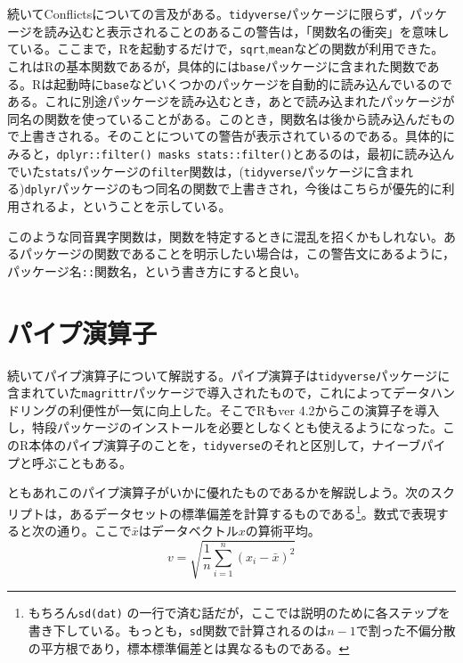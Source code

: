 \documentclass[
  a4paper,
]{ltjsbook}
\begin{document}
続いてConflictsについての言及がある。\texttt{tidyverse}パッケージに限らず，パッケージを読み込むと表示されることのあるこの警告は，「関数名の衝突」を意味している。ここまで，Rを起動するだけで，\texttt{sqrt},\texttt{mean}などの関数が利用できた。これはRの基本関数であるが，具体的には\texttt{base}パッケージに含まれた関数である。Rは起動時に\texttt{base}などいくつかのパッケージを自動的に読み込んでいるのである。これに別途パッケージを読み込むとき，あとで読み込まれたパッケージが同名の関数を使っていることがある。このとき，関数名は後から読み込んだもので上書きされる。そのことについての警告が表示されているのである。具体的にみると，\texttt{dplyr::filter()\ masks\ stats::filter()}とあるのは，最初に読み込んでいた\texttt{stats}パッケージの\texttt{filter}関数は，(\texttt{tidyverse}パッケージに含まれる)\texttt{dplyr}パッケージのもつ同名の関数で上書きされ，今後はこちらが優先的に利用されるよ，ということを示している。

このような同音異字関数は，関数を特定するときに混乱を招くかもしれない。あるパッケージの関数であることを明示したい場合は，この警告文にあるように，パッケージ名\texttt{::}関数名，という書き方にすると良い。

\section{パイプ演算子}\label{ux30d1ux30a4ux30d7ux6f14ux7b97ux5b50}

続いてパイプ演算子について解説する。パイプ演算子は\texttt{tidyverse}パッケージに含まれていた\texttt{magrittr}パッケージで導入されたもので，これによってデータハンドリングの利便性が一気に向上した。そこでRもver
4.2からこの演算子を導入し，特段パッケージのインストールを必要としなくとも使えるようになった。このR本体のパイプ演算子のことを，\texttt{tidyverse}のそれと区別して，ナイーブパイプと呼ぶこともある。

ともあれこのパイプ演算子がいかに優れたものであるかを解説しよう。次のスクリプトは，あるデータセットの標準偏差を計算するものである\footnote{もちろん\texttt{sd(dat)}
  の一行で済む話だが，ここでは説明のために各ステップを書き下している。もっとも，\texttt{sd}関数で計算されるのは\(n-1\)で割った不偏分散の平方根であり，標本標準偏差とは異なるものである。}。数式で表現すると次の通り。ここで\(\bar{x}\)はデータベクトル\(x\)の算術平均。
\[v = \sqrt{\frac{1}{n}\sum_{i=1}^n (x_i - \bar{x})^2}\]
\end{document}
